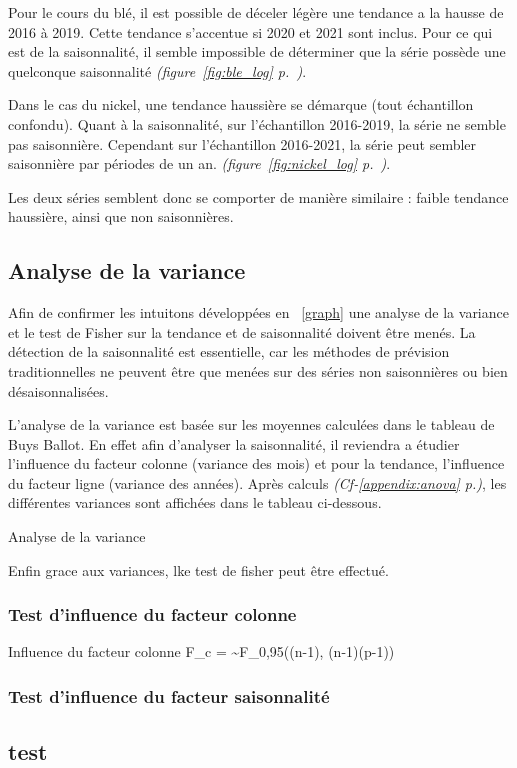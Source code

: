 Pour le cours du blé, il est possible de déceler légère une tendance a la hausse de 2016 à 2019. Cette tendance s'accentue si 2020 et 2021 
sont inclus. Pour ce qui est de la saisonnalité, il semble impossible de déterminer que la série possède une quelconque saisonnalité
\textit{(figure~\ref{fig:ble_log} p.~\pageref{fig:ble_log})}.

Dans le cas du nickel, une tendance haussière se démarque (tout échantillon confondu). Quant à la saisonnalité, sur l'échantillon 2016-2019, 
la série ne semble pas saisonnière. Cependant sur l'échantillon 2016-2021, la série peut sembler saisonnière par périodes de un an.
\textit{(figure~\ref{fig:nickel_log} p.~\pageref{fig:nickel_log})}.

Les deux séries semblent donc se comporter de manière similaire : faible tendance haussière, ainsi que non saisonnières. 

\subsection{Analyse de la variance}
Afin de confirmer les intuitons développées en ~\ref{graph} une analyse de la variance et le test de Fisher sur la tendance et de 
saisonnalité doivent être menés. La détection de la saisonnalité est essentielle, car les méthodes de prévision traditionnelles
ne peuvent être que menées sur des séries non saisonnières ou bien désaisonnalisées.

L'analyse de la variance est basée sur les moyennes calculées dans le tableau de Buys Ballot. En effet afin d'analyser la saisonnalité, 
il reviendra a étudier l'influence du facteur colonne (variance des mois) et pour la tendance, l'influence du facteur ligne (variance des années).
Après calculs \textit{(Cf-\ref{appendix:anova} p.\pageref{appendix:anova})}, les différentes variances sont affichées dans le tableau ci-dessous.

\begin{table}[H]
    \centering
    \caption{Analyse de la variance}
    \sffamily
    
\end{table}

Enfin grace aux variances, lke test de fisher peut être effectué.
\subsubsection{Test d'influence du facteur colonne}
    {Influence du facteur colonne}
    {F_{c} =  \sim F_{0,95}((n-1), (n-1)(p-1))}
\subsubsection{Test d'influence du facteur saisonnalité}

\subsection{test}
